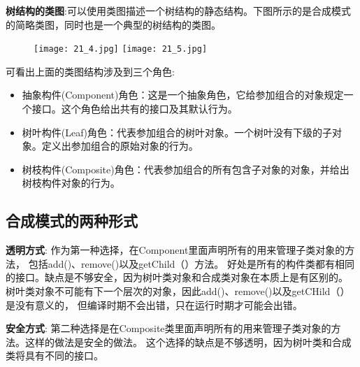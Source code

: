 \documentclass[../main.tex]{subfiles}
\begin{document}
\textbf{树结构的类图}:可以使用类图描述一个树结构的静态结构。下图所示的是合成模式的简略类图，同时也是一个典型的树结构的类图。
\begin{figure}[H]
  \texttt{[image: 21\_4.jpg]}
  \texttt{[image: 21\_5.jpg]}
\end{figure}
%
可看出上面的类图结构涉及到三个角色:
\begin{itemize}
  \item 抽象构件(Component)角色：这是一个抽象角色，它给参加组合的对象规定一个接口。这个角色给出共有的接口及其默认行为。
  \item 树叶构件(Leaf)角色：代表参加组合的树叶对象。一个树叶没有下级的子对象。定义出参加组合的原始对象的行为。
  \item 树枝构件(Composite)角色：代表参加组合的所有包含子对象的对象，并给出树枝构件对象的行为。
\end{itemize}
%
\subsection{合成模式的两种形式}
\textbf{透明方式}:
作为第一种选择，在Component里面声明所有的用来管理子类对象的方法，
包括add()、remove()以及getChild（）方法。
好处是所有的构件类都有相同的接口。缺点是不够安全，因为树叶类对象和合成类对象在本质上是有区别的。
树叶类对象不可能有下一个层次的对象，因此add()、remove()以及getCHild（）是没有意义的，
但编译时期不会出错，只在运行时期才可能会出错。

\textbf{安全方式}:
第二种选择是在Composite类里面声明所有的用来管理子类对象的方法。这样的做法是安全的做法。
这个选择的缺点是不够透明，因为树叶类和合成类将具有不同的接口。
\end{document}
